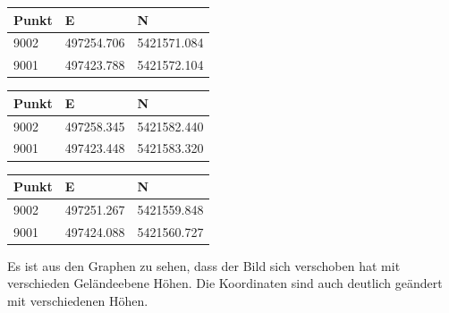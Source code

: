 \documentclass[12pt]{article}
\begin{document}
\begin{table}[ht] \centering
	\begin{tabular}{|l|l|l|}
		\hline
		Punkt & E          & N           \\ \hline
		9002  & 497254.706 & 5421571.084 \\ \hline
		9001  & 497423.788 & 5421572.104 \\ \hline
	\end{tabular}
	\begin{tabular}{|l|l|l|}
	\hline
	Punkt & E          & N           \\ \hline
	9002  & 497258.345 & 5421582.440 \\ \hline
	9001  & 497423.448 & 5421583.320 \\ \hline
	\end{tabular}
	\begin{tabular}{|l|l|l|}
	\hline
	Punkt & E          & N           \\ \hline
	9002  & 497251.267 & 5421559.848 \\ \hline
	9001  & 497424.088 & 5421560.727 \\ \hline
	\end{tabular}
\end{table}
Es ist aus den Graphen zu sehen, dass der Bild sich verschoben hat mit verschieden Geländeebene Höhen. Die Koordinaten sind auch deutlich geändert mit verschiedenen Höhen. 
\end{document}
